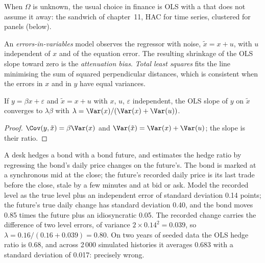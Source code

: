 When $\Omega$ is unknown, the usual choice in finance is OLS with a  that does not assume it away: the sandwich of
chapter~11, HAC for time series, clustered for panels (below).

\begin{definition}\label{def:qm:linear-models-under-stress:eiv}
An \emph{errors-in-variables} model observes the regressor with noise, $\tilde x = x + u$, with $u$ independent of $x$
and of the equation error. The resulting shrinkage of the OLS slope toward zero is the \emph{attenuation bias}. \emph{Total
least squares} fits the line minimising the sum of squared perpendicular distances, which is consistent when the errors in
$x$ and in $y$ have equal variances.
\end{definition}

\begin{proposition}\label{prop:qm:linear-models-under-stress:attenuation}
If $y = \beta x + \varepsilon$ and $\tilde x = x + u$ with $x$, $u$, $\varepsilon$ independent, the OLS slope of $y$ on $\tilde x$ converges to
$\lambda\beta$ with $\lambda = \Var(x)/(\Var(x) + \Var(u))$.
\end{proposition}

\begin{proof}
$\Cov(y, \tilde x) = \beta\Var(x)$ and $\Var(\tilde x) = \Var(x) + \Var(u)$; the slope is their ratio.
\end{proof}

A desk hedges a bond with a bond future, and estimates the hedge ratio by regressing the bond's daily price changes on the future's. The bond
is marked at a synchronous mid at the close; the future's recorded daily price is its last trade before the close, stale by a few minutes and
at bid or ask. Model the recorded level as the true level plus an independent error of standard deviation 0.14 points; the future's true
daily change has standard deviation 0.40, and the bond moves 0.85 times the future plus an idiosyncratic 0.05. The recorded change carries
the difference of two level errors, of variance $2 \times 0.14^2 = 0.039$, so $\lambda = 0.16/(0.16 + 0.039) = 0.80$. On two years of seeded data
the OLS hedge ratio is 0.68, and across 2\,000 simulated histories it averages 0.683 with a standard deviation of 0.017: precisely wrong.

